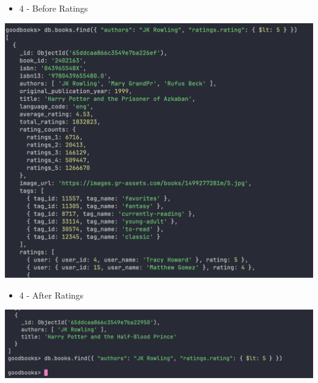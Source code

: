 \documentclass[11pt]{article}
\begin{document}
\begin{itemize}
\item 4 - Before Ratings
\end{itemize}
\begin{center}
\includegraphics[width=1\textwidth]{images/KFWJOR001/4-before-ratings.png}
\end{center}

\begin{itemize}
\item 4 - After Ratings
\end{itemize}
\begin{center}
\includegraphics[width=1\textwidth]{images/KFWJOR001/4-after-ratings.png}
\end{center}
\end{document}
